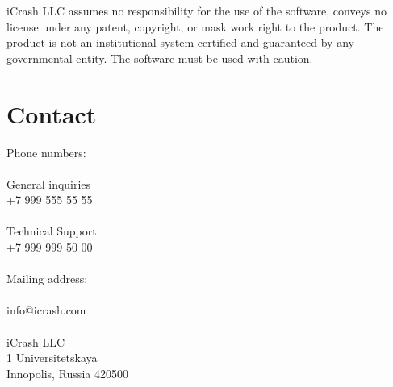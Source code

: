 iCrash LLC assumes no responsibility for the use of the software, conveys no
license under any patent, copyright, or mask work right to the product.
The product is not an institutional system certified and guaranteed by any
governmental entity.
The software must be used with caution.

\section{Contact}
Phone numbers:\\
\\
General inquiries\\
+7 999 555 55 55\\
\\
Technical Support\\
+7 999 999 50 00\\
\\
Mailing address:\\
\\
info@icrash.com\\
\\
iCrash LLC\\
1 Universitetskaya\\
Innopolis, Russia 420500
